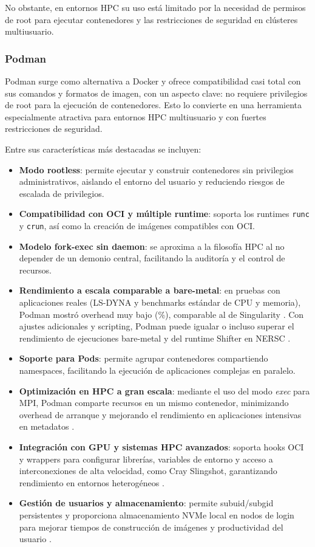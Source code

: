 No obstante, en entornos HPC su uso está limitado por la necesidad de permisos de root para ejecutar contenedores y las restricciones de seguridad en clústeres multiusuario.

\subsubsection{Podman}

Podman surge como alternativa a Docker y ofrece compatibilidad casi total con sus comandos y formatos de imagen, con un aspecto clave: no requiere privilegios de root para la ejecución de contenedores. Esto lo convierte en una herramienta especialmente atractiva para entornos HPC multiusuario y con fuertes restricciones de seguridad.

Entre sus características más destacadas se incluyen:

\begin{itemize}
    \item \textbf{Modo rootless}: permite ejecutar y construir contenedores sin privilegios administrativos, aislando el entorno del usuario y reduciendo riesgos de escalada de privilegios.
    \item \textbf{Compatibilidad con OCI y múltiple runtime}: soporta los runtimes \texttt{runc} y \texttt{crun}, así como la creación de imágenes compatibles con OCI.
    \item \textbf{Modelo fork-exec sin daemon}: se aproxima a la filosofía HPC al no depender de un demonio central, facilitando la auditoría y el control de recursos.
    \item \textbf{Rendimiento a escala comparable a bare-metal}: en pruebas con aplicaciones reales (LS-DYNA y benchmarks estándar de CPU y memoria), Podman mostró overhead muy bajo (\%), comparable al de Singularity \cite{gantikow2020rootless}. Con ajustes adicionales y scripting, Podman puede igualar o incluso superar el rendimiento de ejecuciones bare-metal y del runtime Shifter en NERSC \cite{stephey2022scaling}.
    \item \textbf{Soporte para Pods}: permite agrupar contenedores compartiendo namespaces, facilitando la ejecución de aplicaciones complejas en paralelo.
    \item \textbf{Optimización en HPC a gran escala}: mediante el uso del modo \textit{exec} para MPI, Podman comparte recursos en un mismo contenedor, minimizando overhead de arranque y mejorando el rendimiento en aplicaciones intensivas en metadatos \cite{stephey2022scaling}.
    \item \textbf{Integración con GPU y sistemas HPC avanzados}: soporta hooks OCI y wrappers para configurar librerías, variables de entorno y acceso a interconexiones de alta velocidad, como Cray Slingshot, garantizando rendimiento en entornos heterogéneos \cite{stephey2022scaling}.
    \item \textbf{Gestión de usuarios y almacenamiento}: permite subuid/subgid persistentes y proporciona almacenamiento NVMe local en nodos de login para mejorar tiempos de construcción de imágenes y productividad del usuario \cite{stephey2022scaling}.
\end{itemize}

